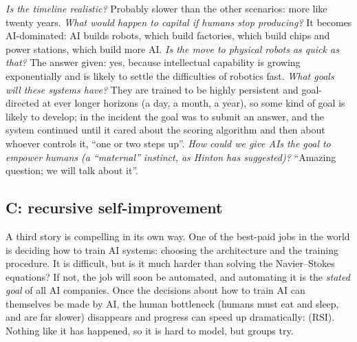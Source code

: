 \begin{discussion}
\emph{Is the timeline realistic?} Probably slower than the other scenarios: more like twenty years. \emph{What would happen to capital if humans stop producing?} It becomes AI-dominated: AI builds robots, which build factories, which build chips and power stations, which build more AI.
\emph{Is the move to physical robots as quick as that?} The answer given: yes, because intellectual capability is growing exponentially and is likely to settle the difficulties of robotics fast. \emph{What goals will these systems have?} They are trained to be highly persistent and goal-directed at ever longer horizons (a day, a month, a year),
so some kind of goal is likely to develop; in the incident the goal was to submit an answer, and the system continued until it cared about the scoring algorithm and then about whoever controls it, ``one or two steps up''. \emph{How could we give AIs the goal to empower humans (a ``maternal'' instinct, as Hinton has suggested)?}
``Amazing question; we will talk about it''.
\end{discussion}

\subsection{C: recursive self-improvement}\label{sec:L1-rsi}
A third story is compelling in its own way. One of the best-paid jobs in the world is deciding how to train AI systems: choosing the architecture and the training procedure. It is difficult, but is it much harder than solving the Navier--Stokes equations?
If not, the job will soon be automated, and automating it is the \emph{stated goal} of all AI companies. Once the decisions about how to train AI can themselves be made by AI, the human bottleneck (humans must eat and sleep, and are far slower) disappears and
progress can speed up dramatically:  (RSI). Nothing like it has happened, so it is hard to model, but groups try.

